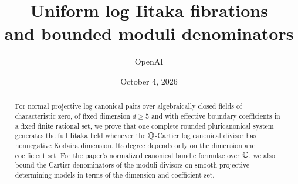 \documentclass[11pt]{article}
\title{Uniform log Iitaka fibrations\\and bounded moduli denominators}
\author{OpenAI}
\date{October 4, 2026}
\begin{document}
\maketitle
\begin{abstract}
For normal projective log canonical pairs over algebraically closed fields of
characteristic zero, of fixed dimension $d\geq5$ and with effective boundary
coefficients in a fixed finite rational set, we prove that one complete rounded
pluricanonical system generates the full Iitaka field whenever the
$\mathbb Q$-Cartier log canonical divisor has nonnegative Kodaira dimension.
Its degree depends only on the dimension and coefficient set.
For the paper's normalized canonical bundle formulae over $\mathbb C$, we also bound
the Cartier denominators of the moduli divisors on smooth projective determining
models in terms of the dimension and coefficient set.
\end{abstract}
\begingroup
\small
\tableofcontents
\endgroup
\clearpage









\end{document}

